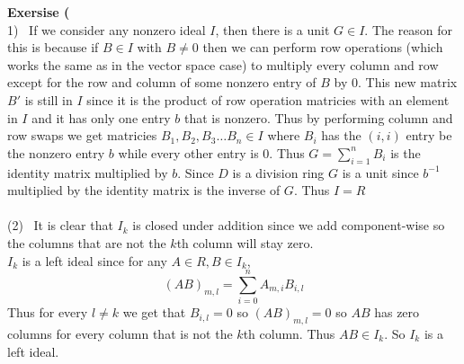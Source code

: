 \documentclass[12pt]{article}
\newenvironment{ques}[1]{\textbf{Exersise #1}\vspace{1 mm}\\ }{\bigskip}
\theoremstyle{definition}
\begin{document}
\begin{ques}{7.6}
	(1) \ If we consider any nonzero ideal $I$, then there is a unit $G \in I$.
	The reason for this is because if $B \in I$ with $B \neq 0$ then we can
	perform row operations (which works the same as in
	the vector space case) to multiply every column and row except for the row
	and column of some nonzero entry of $B$ by $0$. This new matrix $B'$ is
	still in $I$ since it is the product of row operation matricies with an
	element in $I$ and it has only one entry $b$ that is nonzero. Thus by
	performing column and row swaps we get matricies $B_1, B_2, B_3 \dots B_n \in I$
	where $B_i$ has the $(i,i)$ entry be the nonzero entry $b$ while every
	other entry is $0$. Thus $G = \sum_{i=1}^n B_i$ is the identity matrix
	multiplied by $b$. Since $D$ is a division ring $G$ is a unit since
	$b^{-1}$ multiplied by the identity matrix is the inverse of $G$. Thus $I = R$\\
	\\
	(2) \ It is clear that $I_k$ is closed under addition since we add
	component-wise so the columns that are not the $k$th column will stay zero.\\
	$I_k$ is a left ideal since for any $A \in R, B \in I_k$, 
	$$(AB)_{m,l} = \sum_{i = 0}^n A_{m,i}B_{i,l}$$
	Thus for every $l \neq k$ we get that $B_{i,l} = 0$ so $(AB)_{m,l} = 0$ so
	$AB$ has zero columns for every column that is not the $k$th column. Thus
	$AB \in I_k$. So $I_k$ is a left ideal.
\end{ques}
\end{document}
